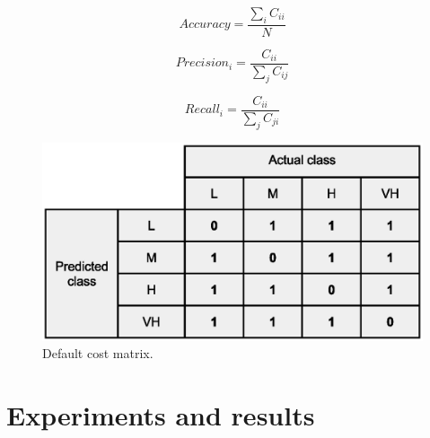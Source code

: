 \documentclass{llncs}
\begin{document}
\begin{equation}
Accuracy=\frac{\sum_{i}C_{ii}}{N}
\label{equation:acc}
\end{equation}


\begin{equation}
Precision_{i}=\frac{C_{ii}}{\sum_{j}C_{ij}}
\label{equation:precision}
\end{equation}


\begin{equation}
Recall_{i}=\frac{C_{ii}}{\sum_{j}C_{ji}}
\label{equation:recall}
\end{equation}

\begin{figure}[ht]
\begin{center}
\includegraphics[scale=0.40]{Confusion-matrix-multiclass-default}
\end{center}
\caption{Default cost matrix.}
\label{fig:count}
\end{figure}





\section{Experiments and results}

\end{document}
